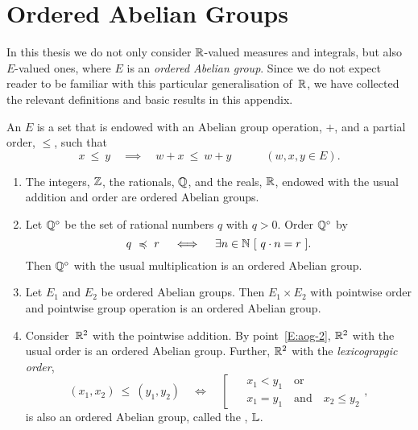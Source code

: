 \section{Ordered Abelian Groups}
\label{S:ag}
\noindent
In this thesis
we do not only consider $\mathbb{R}$-valued measures and integrals,
but also~$E$-valued ones, 
where $E$ is an \emph{ordered Abelian group}.
Since we do not expect reader to be familiar with this
particular generalisation of~$\mathbb{R}$,
we have collected the relevant definitions
and basic results in this appendix.
\begin{dfn}
\label{D:oag}
An  $E$
is a set that is endowed with an Abelian group operation, $+$,
and a partial order, $\leq$, 
such that 
\begin{equation*}
x \ \leq\ y \quad\implies\quad w+x \ \leq\ w+y
\qquad\quad(w,x,y\in E).
\end{equation*}
\end{dfn}
%
%
\begin{exs}
\label{E:oag}
\begin{enumerate}
\item
\label{E:aog-1}
The integers, $\mathbb{Z}$, the rationals, $\mathbb{Q}$, and the reals, $\mathbb{R}$,
endowed with  the usual addition and order
are ordered Abelian groups.

\item
\label{E:oag_div}
Let
$\mathbb{Q}^{\circ}$
be the set of rational numbers $q$ with $q>0$.
Order $\mathbb{Q}^\circ$ by
\begin{equation*}
q \ \preccurlyeq \ r
\quad\iff\quad 
\exists n\in \mathbb{N} \ [\ q \cdot n = r \ ].
\end{equation*}
Then $\mathbb{Q}^\circ$ with 
the usual multiplication is an  ordered Abelian group.

\item
\label{E:aog-2}
Let $E_1$ and $E_2$ be ordered Abelian groups.
Then $E_1\times E_2$ with pointwise order
and pointwise group operation is an ordered Abelian group.

\item
\label{E:oag_lex}
Consider~$\mathbb{R}^2$ with the pointwise addition.
By point~\ref{E:aog-2},
$\mathbb{R}^2$ with the usual order
is an  ordered Abelian group.
Further,
$\mathbb{R}^2$ with the
 \emph{lexicograpgic order},
\begin{equation*}
(x_1,x_2)\ \leq\ (y_1,y_2)
\quad\iff\quad
\left[ \ \ 
\begin{alignedat}{3}
&x_1 < y_1 \quad\text{or}\\
&x_1 = y_1  \quad\text{and}\quad  x_2 \leq y_2 
\end{alignedat}
\right.,
\end{equation*}
is also an ordered Abelian group,
called the ,
 $\mathbb{L}$.
\end{enumerate}
\end{exs}

